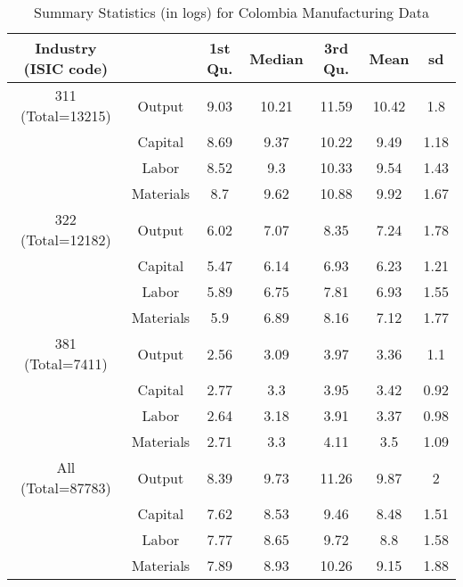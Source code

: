 \begin{table}[H]
\centering
\caption{Summary Statistics (in logs) for Colombia Manufacturing Data} 
\begin{tabular}{ccccccc}
  \hline\hline Industry (ISIC code) &   & 1st Qu. & Median & 3rd Qu. & Mean & sd \\ 
  \hline
311 (Total=13215) & Output & 9.03 & 10.21 & 11.59 & 10.42 & 1.8 \\ 
   & Capital & 8.69 & 9.37 & 10.22 & 9.49 & 1.18 \\ 
   & Labor & 8.52 & 9.3 & 10.33 & 9.54 & 1.43 \\ 
   & Materials & 8.7 & 9.62 & 10.88 & 9.92 & 1.67 \\ 
  322 (Total=12182) & Output & 6.02 & 7.07 & 8.35 & 7.24 & 1.78 \\ 
   & Capital & 5.47 & 6.14 & 6.93 & 6.23 & 1.21 \\ 
   & Labor & 5.89 & 6.75 & 7.81 & 6.93 & 1.55 \\ 
   & Materials & 5.9 & 6.89 & 8.16 & 7.12 & 1.77 \\ 
  381 (Total=7411) & Output & 2.56 & 3.09 & 3.97 & 3.36 & 1.1 \\ 
   & Capital & 2.77 & 3.3 & 3.95 & 3.42 & 0.92 \\ 
   & Labor & 2.64 & 3.18 & 3.91 & 3.37 & 0.98 \\ 
   & Materials & 2.71 & 3.3 & 4.11 & 3.5 & 1.09 \\ 
  All (Total=87783) & Output & 8.39 & 9.73 & 11.26 & 9.87 & 2 \\ 
   & Capital & 7.62 & 8.53 & 9.46 & 8.48 & 1.51 \\ 
   & Labor & 7.77 & 8.65 & 9.72 & 8.8 & 1.58 \\ 
   & Materials & 7.89 & 8.93 & 10.26 & 9.15 & 1.88 \\ 
   \hline
\end{tabular}
\end{table}
